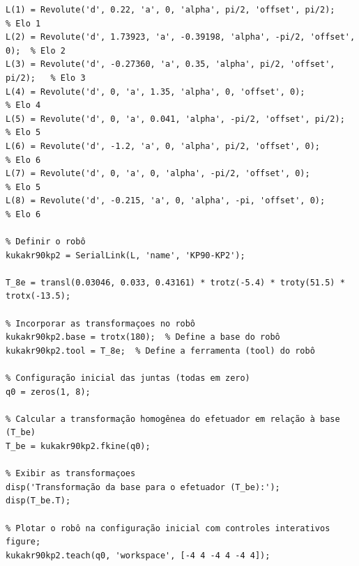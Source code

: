 \documentclass[10pt]{article}
\begin{document}
\begin{lstlisting}[caption={Código do sistema (KR90-KP2)}, label={code:kr90kp2}]
% Parâmetros DH do sistema KP90-KP2
L(1) = Revolute('d', 0.22, 'a', 0, 'alpha', pi/2, 'offset', pi/2);          % Elo 1
L(2) = Revolute('d', 1.73923, 'a', -0.39198, 'alpha', -pi/2, 'offset', 0);  % Elo 2
L(3) = Revolute('d', -0.27360, 'a', 0.35, 'alpha', pi/2, 'offset', pi/2);   % Elo 3
L(4) = Revolute('d', 0, 'a', 1.35, 'alpha', 0, 'offset', 0);                % Elo 4
L(5) = Revolute('d', 0, 'a', 0.041, 'alpha', -pi/2, 'offset', pi/2);        % Elo 5
L(6) = Revolute('d', -1.2, 'a', 0, 'alpha', pi/2, 'offset', 0);             % Elo 6
L(7) = Revolute('d', 0, 'a', 0, 'alpha', -pi/2, 'offset', 0);               % Elo 5
L(8) = Revolute('d', -0.215, 'a', 0, 'alpha', -pi, 'offset', 0);            % Elo 6

% Definir o robô
kukakr90kp2 = SerialLink(L, 'name', 'KP90-KP2');

T_8e = transl(0.03046, 0.033, 0.43161) * trotz(-5.4) * troty(51.5) * trotx(-13.5);

% Incorporar as transformaçoes no robô
kukakr90kp2.base = trotx(180);  % Define a base do robô
kukakr90kp2.tool = T_8e;  % Define a ferramenta (tool) do robô

% Configuração inicial das juntas (todas em zero)
q0 = zeros(1, 8);

% Calcular a transformação homogênea do efetuador em relação à base (T_be)
T_be = kukakr90kp2.fkine(q0);

% Exibir as transformaçoes
disp('Transformação da base para o efetuador (T_be):');
disp(T_be.T);

% Plotar o robô na configuração inicial com controles interativos
figure;
kukakr90kp2.teach(q0, 'workspace', [-4 4 -4 4 -4 4]);
\end{lstlisting}

\newpage
\end{document}
